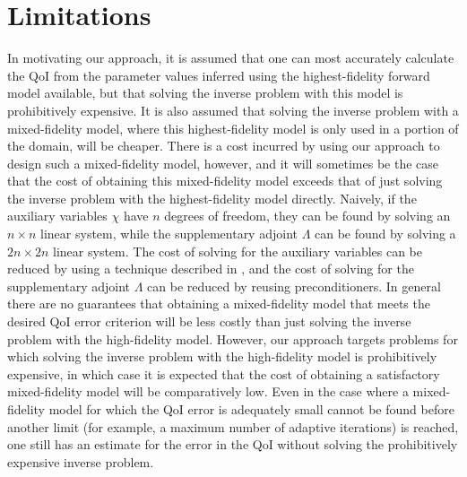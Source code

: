 
\section{Limitations}  \label{sec:limits}

In motivating our approach, it is assumed that one can most accurately calculate the QoI from the parameter values inferred using the highest-fidelity forward model available, but that solving the inverse problem with this model is prohibitively expensive. It is also assumed that solving the inverse problem with a mixed-fidelity model, where this highest-fidelity model is only used in a portion of the domain, will be cheaper. There is a cost incurred by using our approach to design such a mixed-fidelity model, however, and it will sometimes be the case that the cost of obtaining this mixed-fidelity model exceeds that of just solving the inverse problem with the highest-fidelity model directly. Naively, if the auxiliary variables $\chi$ have $n$ degrees of freedom, they can be found by solving an $n\times n$ linear system, while the supplementary adjoint $\Lambda$ can be found by solving a $2n\times2n$ linear system. The cost of solving for the auxiliary variables can be reduced by using a technique described in \cite{BecVex05}, and the cost of solving for the supplementary adjoint $\Lambda$ can be reduced by reusing preconditioners. In general there are no guarantees that obtaining a mixed-fidelity model that meets the desired QoI error criterion will be less costly than just solving the inverse problem with the high-fidelity model. However, our approach targets problems for which solving the inverse problem with the high-fidelity model is prohibitively expensive, in which case it is expected that the cost of obtaining a satisfactory mixed-fidelity model will be comparatively low. Even in the case where a mixed-fidelity model for which the QoI error is adequately small cannot be found before another limit (for example, a maximum number of adaptive iterations) is reached, one still has an estimate for the error in the QoI without solving the prohibitively expensive inverse problem.

